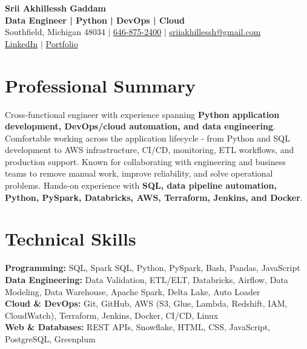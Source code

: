 \documentclass[letterpaper,10pt]{article}
\begin{document}
\fontsize{9.35pt}{10.45pt}\selectfont

\begin{center}
    {\LARGE \textbf{Srii Akhillessh Gaddam}} \\[-1pt]
    \textbf{Data Engineer | Python | DevOps | Cloud} \\[2pt]
    Southfield, Michigan 48034 $|$
    \href{tel:6468752400}{646-875-2400} $|$
    \href{mailto:sriiakhillessh@gmail.com}{sriiakhillessh@gmail.com} \\[1pt]
    \href{https://www.linkedin.com/in/srii-akhiilessh-gaddam-b48668191/}{LinkedIn} $|$
    \href{https://sriiakhillesshg.github.io/portfolio/}{Portfolio}
\end{center}
\vspace{-8pt}

\section{Professional Summary}
\small{Cross-functional engineer with experience spanning \textbf{Python application development, DevOps/cloud automation, and data engineering}. Comfortable working across the application lifecycle - from Python and SQL development to AWS infrastructure, CI/CD, monitoring, ETL workflows, and production support. Known for collaborating with engineering and business teams to remove manual work, improve reliability, and solve operational problems. Hands-on experience with \textbf{SQL, data pipeline automation, Python, PySpark, Databricks, AWS, Terraform, Jenkins, and Docker}.}

\section{Technical Skills}
\small{
\textbf{Programming:} SQL, Spark SQL, Python, PySpark, Bash, Pandas, JavaScript \\
\textbf{Data Engineering:} Data Validation, ETL/ELT, Databricks, Airflow, Data Modeling, Data Warehouse, Apache Spark, Delta Lake, Auto Loader \\
\textbf{Cloud \& DevOps:} Git, GitHub, AWS (S3, Glue, Lambda, Redshift, IAM, CloudWatch), Terraform, Jenkins, Docker, CI/CD, Linux \\
\textbf{Web \& Databases:} REST APIs, Snowflake, HTML, CSS, JavaScript, PostgreSQL, Greenplum
}
\end{document}
